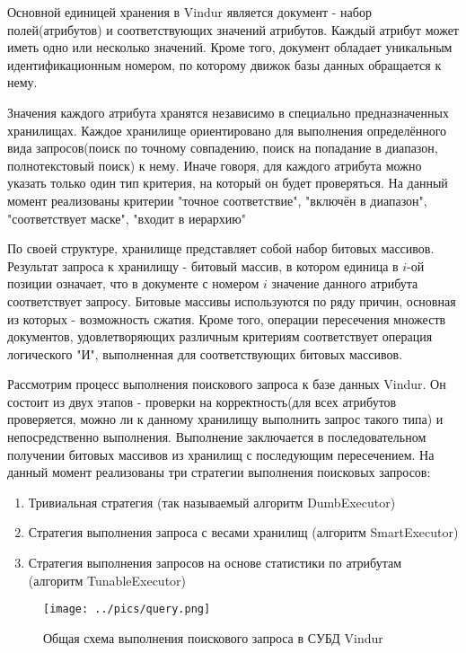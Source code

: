 \documentclass{matmex-diploma}
\begin{document}
    Основной единицей хранения в Vindur является документ - набор полей(атрибутов) и соответствующих значений атрибутов. Каждый атрибут может иметь одно или несколько значений. Кроме того, документ обладает уникальным идентификационным номером, по которому движок базы данных обращается к нему. 
    
    Значения каждого атрибута хранятся независимо в специально предназначенных хранилищах. Каждое хранилище ориентировано для выполнения определённого вида запросов(поиск по точному совпадению, поиск на попадание в диапазон, полнотекстовый поиск) к нему. Иначе говоря, для каждого атрибута можно указать только один тип критерия, на который он будет проверяться. На данный момент реализованы критерии "точное соответствие", "включён в диапазон", "соответствует маске", "входит в иерархию" 
    
    По своей структуре, хранилище представляет собой набор битовых массивов. Результат запроса к хранилищу - битовый массив, в котором единица в $i$-ой позиции означает, что в документе с номером $i$ значение данного атрибута соответствует запросу. Битовые массивы используются по ряду причин, основная из которых - возможность сжатия. Кроме того, операции пересечения множеств документов, удовлетворяющих различным критериям соответствует операция логического "И", выполненная для соответствующих битовых массивов. 
    
    Рассмотрим процесс выполнения поискового запроса к базе данных Vindur. Он состоит из двух этапов - проверки на корректность(для всех атрибутов проверяется, можно ли к данному хранилищу выполнить запрос такого типа) и непосредственно выполнения. Выполнение заключается в последовательном получении битовых массивов из хранилищ с последующим пересечением. На данный момент реализованы три стратегии выполнения поисковых запросов:
    \begin{enumerate}
        \item Тривиальная стратегия (так называемый алгоритм DumbExecutor)
        \item Стратегия выполнения запроса с весами хранилищ (алгоритм SmartExecutor)
        \item Стратегия выполнения запросов на основе статистики по атрибутам (алгоритм TunableExecutor)
    \end{enumerate}
    
    \begin{figure}[H]
        \label{query}
        \centering
        \texttt{[image: ../pics/query.png]}
        \caption{Общая схема выполнения поискового запроса в СУБД Vindur}
    \end{figure}
\end{document}
